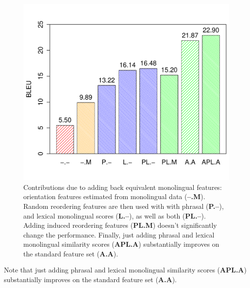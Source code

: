 \documentclass[11pt]{article}
\begin{document}
\begin{figure}[t]
\begin{center}
\includegraphics[width=\linewidth]{../figures/replacement/replacements.pdf}
\caption{Contributions due to adding back equivalent monolingual features: orientation features estimated from monolingual data ({\bf --.M}).  Random reordering features are then used with with phrasal ({\bf P.--}), and lexical monolingual scores ({\bf L.--}), as well as both ({\bf PL.--}).  Adding induced reordering features ({\bf PL.M}) doesn't significantly change the performance.  Finally, just adding phrasal and lexical monolingual similarity scores ({\bf APL.A}) substantially improves on the standard feature set ({\bf A.A}).}
\label{fig:remplacement}
\end{center}
\vskip -0.2in
\end{figure}

Note that just adding phrasal and lexical monolingual similarity scores ({\bf APL.A}) substantially improves on the standard feature set ({\bf A.A}).
\end{document}
